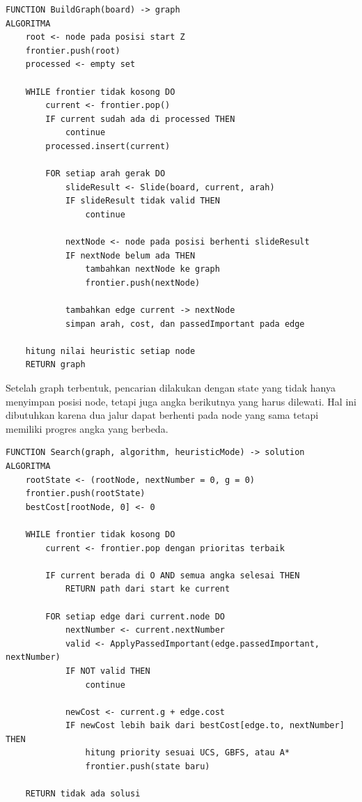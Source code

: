 \documentclass[a4paper,11pt]{article}
\begin{document}
\begin{lstlisting}[language=Pseudocode, caption=Pseudocode Pembentukan Graph Sederhana, label={lst:buildgraph}]
FUNCTION BuildGraph(board) -> graph
ALGORITMA
    root <- node pada posisi start Z
    frontier.push(root)
    processed <- empty set

    WHILE frontier tidak kosong DO
        current <- frontier.pop()
        IF current sudah ada di processed THEN
            continue
        processed.insert(current)

        FOR setiap arah gerak DO
            slideResult <- Slide(board, current, arah)
            IF slideResult tidak valid THEN
                continue

            nextNode <- node pada posisi berhenti slideResult
            IF nextNode belum ada THEN
                tambahkan nextNode ke graph
                frontier.push(nextNode)

            tambahkan edge current -> nextNode
            simpan arah, cost, dan passedImportant pada edge

    hitung nilai heuristic setiap node
    RETURN graph
\end{lstlisting}

Setelah graph terbentuk, pencarian dilakukan dengan state yang tidak hanya menyimpan posisi node, tetapi juga angka berikutnya yang harus dilewati. Hal ini dibutuhkan karena dua jalur dapat berhenti pada node yang sama tetapi memiliki progres angka yang berbeda.

\begin{lstlisting}[language=Pseudocode, caption=Pseudocode Pathfinding, label={lst:pathfinding}]
FUNCTION Search(graph, algorithm, heuristicMode) -> solution
ALGORITMA
    rootState <- (rootNode, nextNumber = 0, g = 0)
    frontier.push(rootState)
    bestCost[rootNode, 0] <- 0

    WHILE frontier tidak kosong DO
        current <- frontier.pop dengan prioritas terbaik

        IF current berada di O AND semua angka selesai THEN
            RETURN path dari start ke current

        FOR setiap edge dari current.node DO
            nextNumber <- current.nextNumber
            valid <- ApplyPassedImportant(edge.passedImportant, nextNumber)
            IF NOT valid THEN
                continue

            newCost <- current.g + edge.cost
            IF newCost lebih baik dari bestCost[edge.to, nextNumber] THEN
                hitung priority sesuai UCS, GBFS, atau A*
                frontier.push(state baru)

    RETURN tidak ada solusi
\end{lstlisting}
\end{document}
